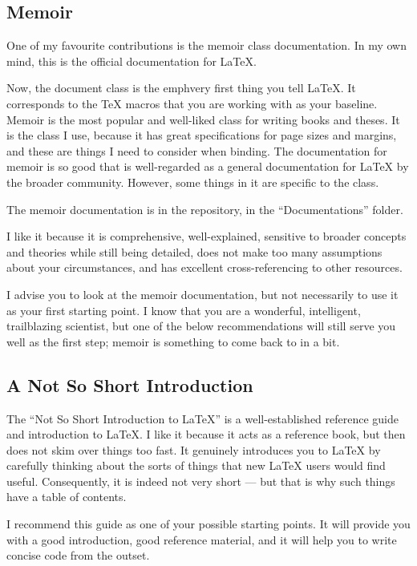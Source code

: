 \documentclass[11pt, oneside]{memoir}
\begin{document}
\subsection{Memoir}

One of my favourite contributions is the memoir class documentation. In my own mind, this is the official documentation for LaTeX.

Now, the document class is the emph{very first thing} you tell LaTeX. It corresponds to the TeX macros that you are working with as your baseline. Memoir is the most popular and well-liked class for writing books and theses. It is the class I use, because it has great specifications for page sizes and margins, and these are things I need to consider when binding. The documentation for memoir is so good that is well-regarded as a general documentation for LaTeX by the broader community. However, some things in it are specific to the class.

The memoir documentation is in the repository, in the  ``Documentations'' folder. 

I like it because it is comprehensive, well-explained, sensitive to broader concepts and theories while still being detailed, does not make too many assumptions about your circumstances, and has excellent cross-referencing to other resources.

I advise you to look at the memoir documentation, but not necessarily to use it as your first starting point. I know that you are a wonderful, intelligent, trailblazing scientist, but one of the below recommendations will still serve you well as the first step; memoir is something to come back to in a bit.

\subsection{A Not So Short Introduction}

The ``Not So Short Introduction to LaTeX'' is a well-established reference guide and introduction to LaTeX. I like it because it acts as a reference book, but then does not skim over things too fast. It genuinely introduces you to LaTeX by carefully thinking about the sorts of things that new LaTeX users would find useful. Consequently, it is indeed not very short — but that is why such things have a table of contents.

I recommend this guide as one of your possible starting points. It will provide you with a good introduction, good reference material, and it will help you to write concise code from the outset.
\end{document}
